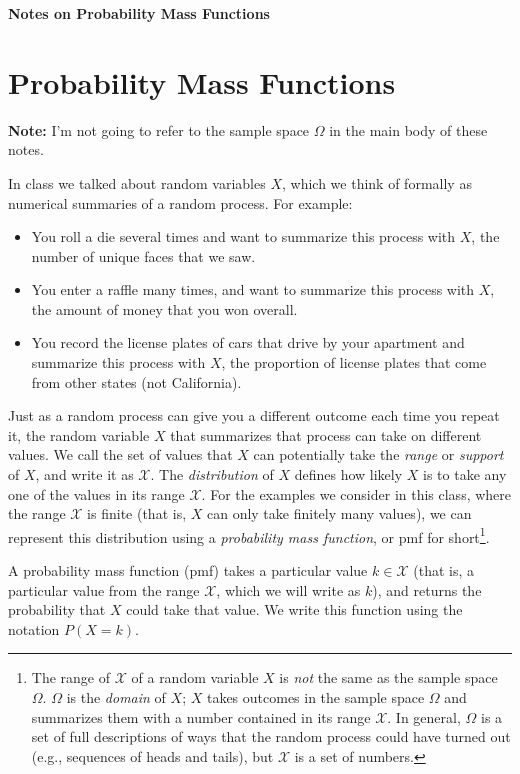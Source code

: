 \documentclass[11pt]{article}
\begin{document}
\centerline{\textbf{Notes on Probability Mass Functions}}
\section*{Probability Mass Functions}
{\bf Note:} I'm not going to refer to the sample space $\Omega$ in the main body of these notes.

In class we talked about random variables $X$, which we think of formally as numerical summaries of a random process.
For example:
\begin{itemize}
\item You roll a die several times and want to summarize this process with $X$, the number of unique faces that we saw.
\item You enter a raffle many times, and want to summarize this process with $X$, the amount of money that you won overall.
\item You record the license plates of cars that drive by your apartment and summarize this process with $X$, the proportion of license plates that come from other states (not California).
\end{itemize}

Just as a random process can give you a different outcome each time you repeat it, the random variable $X$ that summarizes that process can take on different values.
We call the set of values that $X$ can potentially take the \emph{range} or \emph{support} of $X$, and write it as $\mathcal X$. The \emph{distribution} of $X$ defines
how likely $X$ is to take any one of the values in its range $\mathcal X$. For the examples we consider in this class, where the range $\mathcal X$ is finite (that is, $X$ can only take
finitely many values), we can represent this distribution using a \emph{probability mass function}, or pmf for short\footnote{The range of $\mathcal X$ of a random variable $X$ is \emph{not} the same as the sample space $\Omega$. $\Omega$ is the \emph{domain} of $X$; $X$ takes outcomes in the sample space $\Omega$ and summarizes them with a number contained in its range $\mathcal X$. In general, $\Omega$ is a set of full descriptions of ways that the random process could have turned out (e.g., sequences of heads and tails), but $\mathcal X$ is a set of numbers.}.

A probability mass function (pmf) takes a particular value $k \in \mathcal X$ (that is, a particular value from the range $\mathcal X$, which we will write as $k$), and returns the probability that $X$ could take that value. We write this function using the notation $P(X = k)$.
\end{document}
